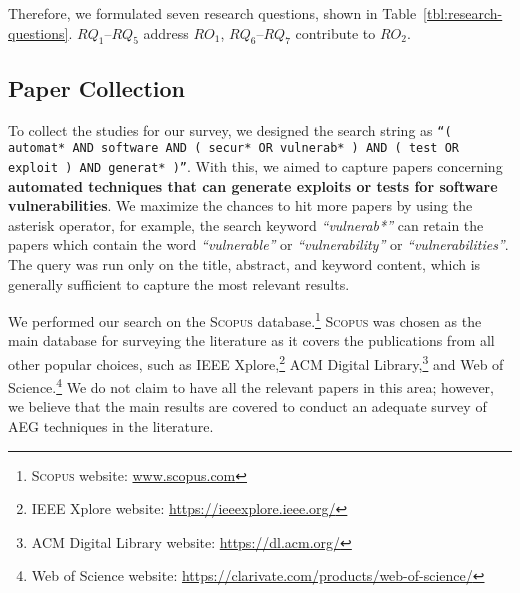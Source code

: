Therefore, we formulated seven research questions, shown in Table~\ref{tbl:research-questions}.
$RQ_1$--$RQ_5$ address $RO_1$, $RQ_6$--$RQ_7$ contribute to $RO_2$.
{}
{}



\subsection{Paper Collection}
\label{sec:paper-collection}
To collect the studies for our survey, we designed the search string as \texttt{``( automat* AND software AND ( secur* OR vulnerab* ) AND ( test OR exploit ) AND generat* )''}.
%
With this, we aimed to capture papers concerning \textbf{automated techniques that can generate exploits or tests for software vulnerabilities}.
We maximize the chances to hit more papers by using the asterisk operator, for example, the search keyword \textit{``vulnerab*''} can retain the papers which contain the word \textit{``vulnerable''} or \textit{``vulnerability''} or \textit{``vulnerabilities''}.
The query was run only on the title, abstract, and keyword content, which is generally sufficient to capture the most relevant results.

{We performed our search on the \textsc{Scopus} database.\footnote{\textsc{Scopus} website: \url{www.scopus.com}} 
\textsc{Scopus} was chosen as the main database for surveying the literature as it covers the publications from all other popular choices, such as IEEE Xplore,\footnote{IEEE Xplore website: \url{https://ieeexplore.ieee.org/}} ACM Digital Library,\footnote{ACM Digital Library website: \url{https://dl.acm.org/}} and Web of Science.\footnote{Web of Science website: \url{https://clarivate.com/products/web-of-science/}}
We do not claim to have all the relevant papers in this area; however, we believe that the main results are covered to conduct an adequate survey of AEG techniques in the literature.}
{}

{}
{}

